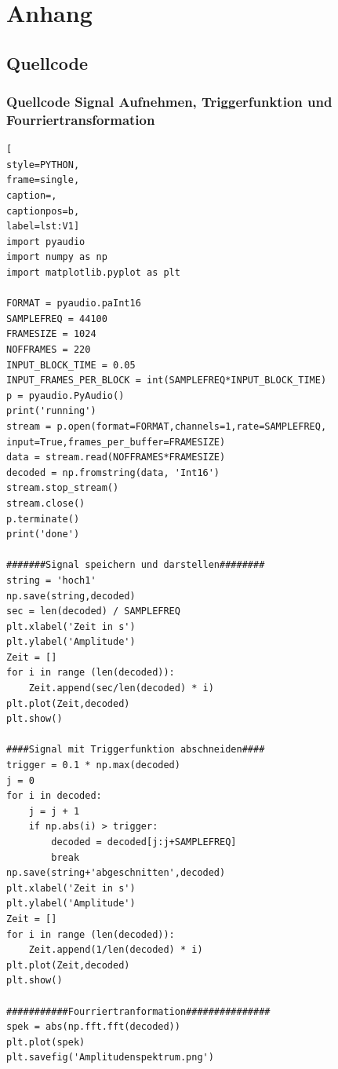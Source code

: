 \documentclass[12pt, oneside, a4paper, \docLanguage]{report}
\begin{document}
%
%
\renewcommand\thesection{A.\arabic{section}}
\renewcommand\thesubsection{\thesection.\arabic{subsection}}

\chapter*{Anhang}
\label{chap:APPENDIX}
\addtocounter{chapter}{1}
\setcounter{section}{0}

\section{Quellcode}
\label{chap:APPENDIX_SOURCECODE}

\subsection{Quellcode Signal Aufnehmen, Triggerfunktion und Fourriertransformation}
\label{chap:APPENDIX_SOURCECODE_V1}
\begin{lstlisting}[
style=PYTHON,
frame=single,
caption=,
captionpos=b,
label=lst:V1]
import pyaudio 
import numpy as np
import matplotlib.pyplot as plt

FORMAT = pyaudio.paInt16
SAMPLEFREQ = 44100
FRAMESIZE = 1024
NOFFRAMES = 220
INPUT_BLOCK_TIME = 0.05 
INPUT_FRAMES_PER_BLOCK = int(SAMPLEFREQ*INPUT_BLOCK_TIME)
p = pyaudio.PyAudio()
print('running')
stream = p.open(format=FORMAT,channels=1,rate=SAMPLEFREQ, input=True,frames_per_buffer=FRAMESIZE)
data = stream.read(NOFFRAMES*FRAMESIZE) 
decoded = np.fromstring(data, 'Int16')
stream.stop_stream() 
stream.close() 
p.terminate() 
print('done') 

#######Signal speichern und darstellen########
string = 'hoch1'
np.save(string,decoded)
sec = len(decoded) / SAMPLEFREQ
plt.xlabel('Zeit in s')
plt.ylabel('Amplitude')
Zeit = []
for i in range (len(decoded)):
    Zeit.append(sec/len(decoded) * i)
plt.plot(Zeit,decoded) 
plt.show()

####Signal mit Triggerfunktion abschneiden####
trigger = 0.1 * np.max(decoded)
j = 0
for i in decoded:
    j = j + 1
    if np.abs(i) > trigger:
        decoded = decoded[j:j+SAMPLEFREQ]
        break
np.save(string+'abgeschnitten',decoded)
plt.xlabel('Zeit in s')
plt.ylabel('Amplitude')
Zeit = []
for i in range (len(decoded)):
    Zeit.append(1/len(decoded) * i)
plt.plot(Zeit,decoded) 
plt.show()

###########Fourriertranformation###############
spek = abs(np.fft.fft(decoded))
plt.plot(spek)
plt.savefig('Amplitudenspektrum.png')
\end{lstlisting}
\end{document}
